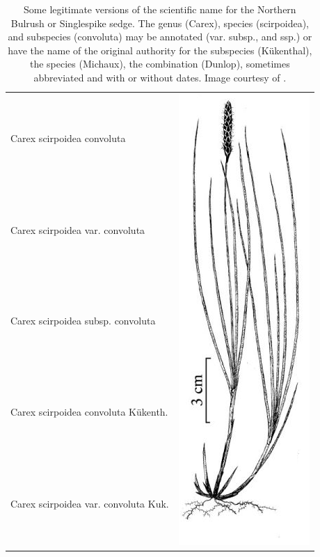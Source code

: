 \documentclass{bmcart}
\begin{document}
\begin{table}[!htb]
  \begin{center}
  \caption{Some legitimate versions of the scientific name for the Northern
    Bulrush or Singlespike sedge.  The genus (Carex), species (scirpoidea), and
    subspecies (convoluta) may be annotated (var. subsp., and ssp.) or have the
    name of the original authority for the subspecies (Kükenthal), the species
    (Michaux), the combination (Dunlop), sometimes abbreviated and with or
    without dates. Image courtesy of \cite{FNA2002}.}\label{table:carex}
    \begin{tabular}{| l | c |}
    \hline
    Carex scirpoidea convoluta &
    \multirow{24}{*}{\includegraphics[scale=0.3]{images/carex.png}} \\
    Carex scirpoidea var. convoluta & \\
    Carex scirpoidea subsp. convoluta & \\
    Carex scirpoidea convoluta Kükenth. & \\
    Carex scirpoidea var. convoluta Kuk. & \\

\end{tabular}
\end{center}
\end{table}
\end{document}
